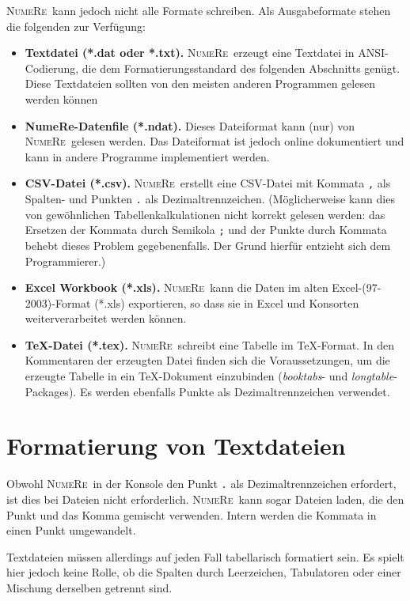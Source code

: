\documentclass[DIV=14,headsepline,footsepline]{scrbook}
\newcommand{\NR}{\textsc{Nu\-me\-Re}}
\begin{document}
				\NR\ kann jedoch nicht alle Formate schreiben. Als Ausgabeformate stehen die folgenden zur Verfügung:
				\begin{itemize}
					\item \textbf{Textdatei (*.dat oder *.txt).} \NR\ erzeugt eine Textdatei in ANSI-Codierung, die dem Formatierungsstandard des folgenden Abschnitts genügt. Diese Textdateien sollten von den meisten anderen Programmen gelesen werden können
					\item \textbf{NumeRe-Datenfile (*.ndat).} Dieses Dateiformat kann (nur) von \NR\ gelesen werden. Das Dateiformat ist jedoch online dokumentiert und kann in andere Programme implementiert werden.
					\item \textbf{CSV-Datei (*.csv).} \NR\ erstellt eine CSV-Datei mit Kommata \verb+,+ als Spalten- und Punkten \verb+.+ als Dezimaltrennzeichen. (Möglicherweise kann dies von gewöhnlichen Tabellenkalkulationen nicht korrekt gelesen werden: das Ersetzen der Kommata durch Semikola \verb+;+ und der Punkte durch Kommata behebt dieses Problem gegebenenfalls. Der Grund hierfür entzieht sich dem Programmierer.)
					\item \textbf{Excel Workbook (*.xls).} \NR\ kann die Daten im alten Excel-(97-2003)-Format (*.xls) exportieren, so dass sie in Excel und Konsorten weiterverarbeitet werden können.
					\item \textbf{\TeX-Datei (*.tex).} \NR\ schreibt eine Tabelle im \TeX-Format. In den Kommentaren der erzeugten Datei finden sich die Voraussetzungen, um die erzeugte Tabelle in ein \TeX-Do\-ku\-ment einzubinden (\emph{booktabs}- und \emph{longtable}-Packages). Es werden ebenfalls Punkte als Dezimaltrennzeichen verwendet.
				\end{itemize}
				
			\section{Formatierung von Textdateien}
				Obwohl \NR\ in der Konsole den Punkt \verb+.+ als Dezimaltrennzeichen erfordert, ist dies bei Dateien nicht erforderlich. \NR\ kann sogar Dateien laden, die den Punkt und das Komma gemischt verwenden. Intern werden die Kommata in einen Punkt umgewandelt.
				
				Textdateien müssen allerdings auf jeden Fall tabellarisch formatiert sein. Es spielt hier jedoch keine Rolle, ob die Spalten durch Leerzeichen, Tabulatoren oder einer Mischung derselben getrennt sind.
				
\end{document}
